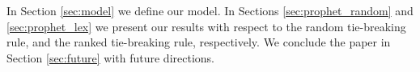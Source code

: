 In Section \ref{sec:model} we define our model. 
In Sections \ref{sec:prophet_random}  and \ref{sec:prophet_lex} we present our results with respect to the
random tie-breaking rule, and the ranked tie-breaking rule, respectively.
We conclude the paper in Section \ref{sec:future} with future directions.



